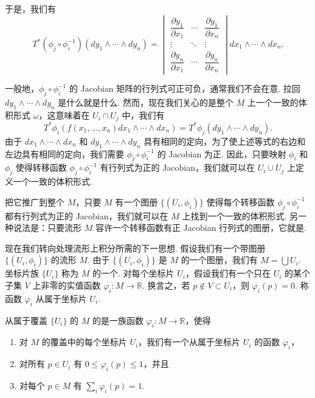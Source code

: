 于是，我们有
\[
T^*\left(\phi_j\circ\phi_i^{-1}\right)\left(dy_1\wedge\cdots\wedge dy_n\right)=\begin{vmatrix}\dfrac{\partial y_1}{\partial x_1}&\cdots&\dfrac{\partial y_1}{\partial x_n}\\[1.2em] \vdots&\ddots&\vdots\\[0.6em] \dfrac{\partial y_n}{\partial x_1}&\cdots&\dfrac{\partial y_n}{\partial x_n}\end{vmatrix}dx_1\wedge\cdots\wedge dx_n.
\]

一般地，$\phi_j\circ\phi_i^{-1}$ 的 Jacobian 矩阵的行列式可正可负，通常我们不会在意. 拉回 $dy_1\wedge\cdots\wedge dy_n$ 是什么就是什么. 然而，现在我们关心的是整个 $M$ 上一个一致的体积形式 $\omega$，这意味着在 $U_i\cap U_j$ 中，我们有
\[
T^*\phi_i\left(f(x_1,\ldots,x_n)dx_1\wedge\cdots\wedge dx_n\right)=T^*\phi_j\left(dy_1\wedge\cdots\wedge dy_n\right).
\]
由于 $dx_1\wedge\cdots\wedge dx_n$ 和 $dy_1\wedge\cdots\wedge dy_n$ 具有相同的定向，为了使上述等式的右边和左边具有相同的定向，我们需要 $\phi_j\circ\phi_i^{-1}$ 的 Jacobian 为正. 因此，只要映射 $\phi_i$ 和 $\phi_j$ 使得转移函数 $\phi_j\circ\phi_i^{-1}$ 有行列式为正的 Jacobian，我们就可以在 $U_i\cup U_j$ 上定义一个一致的体积形式.

把它推广到整个 $M$，只要 $M$ 有一个图册 $\{(U_i,\phi_i)\}$ 使得每个转移函数 $\phi_j\circ\phi_i^{-1}$ 都有行列式为正的 Jacobian，我们就可以在 $M$ 上找到一个一致的体积形式. 另一种说法是：只要流形 $M$ 容许一个转移函数有正 Jacobian 行列式的图册，它就是.

现在我们转向处理流形上积分所需的下一思想. 假设我们有一个带图册 $\{(U_i,\phi_i)\}$ 的流形 $M$. 由于 $\{(U_i,\phi_i)\}$ 是 $M$ 的一个图册，我们有 $M=\bigcup U_i$. 坐标片族 $\{U_i\}$ 称为 $M$ 的一个. 对每个坐标片 $U_i$，假设我们有一个只在 $U_i$ 的某个子集 $V$ 上非零的实值函数 $\varphi_i:M\to\mathbb{R}$. 换言之，若 $p\notin V\subset U_i$，则 $\varphi_i(p)=0$. 称函数 $\varphi_i$ 从属于坐标片 $U_i$.

\begin{definition}[单位分解]\label{def:10-4-2}
从属于覆盖 $\{U_i\}$ 的 $M$ 的是一族函数 $\varphi_i:M\to\mathbb{R}$，使得
\begin{enumerate}
  \item[(a)] 对 $M$ 的覆盖中的每个坐标片 $U_i$，我们有一个从属于坐标片 $U_i$ 的函数 $\varphi_i$，
  \item[(b)] 对所有 $p\in U_i$ 有 $0\leq\varphi_i(p)\leq 1$，并且
  \item[(c)] 对每个 $p\in M$ 有 $\sum_i\varphi_i(p)=1$.
\end{enumerate}
\end{definition}

